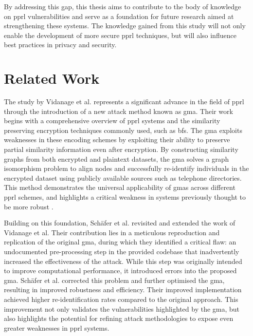 By addressing this gap, this thesis aims to contribute to the body of knowledge on \ac{pprl} vulnerabilities and serve as a foundation for future research aimed at strengthening these systems. 
The knowledge gained from this study will not only enable the development of more secure \ac{pprl} techniques, but will also influence best practices in privacy and security.

\section{Related Work}  \label{sec:rel-work}

The study by Vidanage et al. \cite{vidanage2020graph} represents a significant advance in the field of \ac{pprl} through the introduction of a new attack method known as \ac{gma}. 
Their work begins with a comprehensive overview of \ac{pprl} systems and the similarity preserving encryption techniques commonly used, such as \ac{bf}s. 
The \ac{gma} exploits weaknesses in these encoding schemes by exploiting their ability to preserve partial similarity information even after encryption. 
By constructing similarity graphs from both encrypted and plaintext datasets, the \ac{gma} solves a graph isomorphism problem to align nodes and successfully re-identify individuals in the encrypted dataset using publicly available sources such as telephone directories. 
This method demonstrates the universal applicability of \ac{gma}s across different \ac{pprl} schemes, and highlights a critical weakness in systems previously thought to be more robust \cite{vidanage2020graph}.

Building on this foundation, Schäfer et al. \cite{schaefer2024} revisited and extended the work of Vidanage et al. 
Their contribution lies in a meticulous reproduction and replication of the original \ac{gma}, during which they identified a critical flaw: an undocumented pre-processing step in the provided codebase that inadvertently increased the effectiveness of the attack. 
While this step was originally intended to improve computational performance, it introduced errors into the proposed \ac{gma}. 
Schäfer et al. corrected this problem and further optimised the \ac{gma}, resulting in improved robustness and efficiency. 
Their improved implementation achieved higher re-identification rates compared to the original approach. 
This improvement not only validates the vulnerabilities highlighted by the \ac{gma}, but also highlights the potential for refining attack methodologies to expose even greater weaknesses in \ac{pprl} systems.

